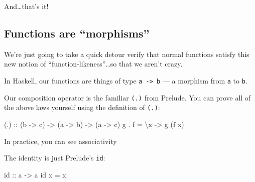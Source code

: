 \documentclass[]{article}
\newenvironment{Shaded}{}{}
\newcommand{\DataTypeTok}[1]{\textcolor[rgb]{0.56,0.13,0.00}{{#1}}}
\newcommand{\DecValTok}[1]{\textcolor[rgb]{0.25,0.63,0.44}{{#1}}}
\newcommand{\OtherTok}[1]{\textcolor[rgb]{0.00,0.44,0.13}{{#1}}}
\newcommand{\FunctionTok}[1]{\textcolor[rgb]{0.02,0.16,0.49}{{#1}}}
\newcommand{\NormalTok}[1]{{#1}}
\begin{document}
And\ldots{}that's it!

\subsection{\texorpdfstring{Functions are
``morphisms''}{Functions are morphisms}}\label{functions-are-morphisms}

We're just going to take a quick detour verify that normal functions
satisfy this new notion of ``function-likeness''\ldots{}so that we
aren't crazy.

In Haskell, our functions are things of type
\texttt{a\ -\textgreater{}\ b} --- a morphism from \texttt{a} to
\texttt{b}.

Our composition operator is the familiar \texttt{(.)} from Prelude. You
can prove all of the above laws yourself using the definition of
\texttt{(.)}:

\begin{Shaded}
\begin{Highlighting}[]
\OtherTok{(.) ::} \NormalTok{(b }\OtherTok{->} \NormalTok{c) }\OtherTok{->} \NormalTok{(a }\OtherTok{->} \NormalTok{b) }\OtherTok{->} \NormalTok{(a }\OtherTok{->} \NormalTok{c)}
\NormalTok{g }\FunctionTok{.} \NormalTok{f }\FunctionTok{=} \NormalTok{\textbackslash{}x }\OtherTok{->} \NormalTok{g (f x)}
\end{Highlighting}
\end{Shaded}

In practice, you can see associativity

\begin{Shaded}
\end{Shaded}

The identity is just Prelude's \texttt{id}:

\begin{Shaded}
\begin{Highlighting}[]
\NormalTok{id}\OtherTok{ ::} \NormalTok{a }\OtherTok{->} \NormalTok{a}
\NormalTok{id x }\FunctionTok{=} \NormalTok{x}
\end{Highlighting}
\end{Shaded}
\end{document}
